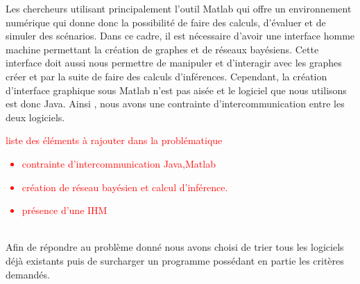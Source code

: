 \documentclass[conference]{IEEEtran}
\begin{document}
\tableofcontents
\vspace{0.8cm}
Les chercheurs utilisant principalement l'outil Matlab qui offre un environnement numérique qui donne donc la possibilité de faire des calculs, d'évaluer et de simuler des scénarios. Dans ce cadre, il est nécessaire d'avoir une interface homme machine permettant la création de graphes et de réseaux bayésiens. Cette interface doit aussi nous permettre de manipuler et d'interagir avec les graphes créer et par la suite de faire des calculs d'inférences. Cependant, la création d'interface graphique sous Matlab n'est pas aisée et le logiciel que nous utilisons est donc Java. Ainsi , nous avons une contrainte d'intercommunication entre les deux logiciels. 

\textcolor{red}{
	liste des éléments à rajouter dans la problématique
	\begin{itemize}
	\item contrainte d'intercommunication Java,Matlab
	\item création de réseau bayésien et calcul d'inférence.
	\item présence d'une IHM
	\end{itemize}
}

\\
Afin de répondre au problème donné nous avons choisi de trier tous les logiciels déjà existants puis de surcharger un programme possédant en partie les critères demandés. \\




%
%
\end{document}
